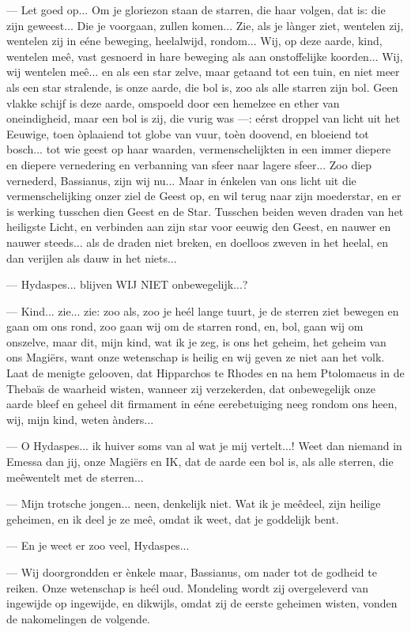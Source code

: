 \documentclass[a4paper, 12pt, oneside, dutch]{article}
\begin{document}
--- Let goed op... Om je gloriezon staan de starren, die haar volgen, dat is: die zijn geweest... Die je voorgaan, zullen komen... Zie, als je lànger ziet, wentelen zij, wentelen zij in eéne beweging, heelalwijd, rondom... Wij, op deze aarde, kind, wentelen meê, vast gesnoerd in hare beweging als aan onstoffelijke koorden... Wij, wij wentelen meê... en als een star zelve, maar getaand tot een tuin, en niet meer als een star stralende, is onze aarde, die bol is, zoo als alle starren zijn bol. Geen vlakke schijf is deze aarde, omspoeld door een hemelzee en ether van oneindigheid, maar een bol is zij, die vurig was ---: eérst droppel van licht uit het Eeuwige, toen òplaaiend tot globe van vuur, toèn doovend, en bloeiend tot bosch... tot wie geest op haar waarden, vermenschelijkten in een immer diepere en diepere vernedering en verbanning van sfeer naar lagere sfeer... Zoo diep vernederd, Bassianus, zijn wij nu... Maar in énkelen van ons licht uit die vermenschelijking onzer ziel de Geest op, en wil terug naar zijn moederstar, en er is werking tusschen dien Geest en de Star. Tusschen beiden weven draden van het heiligste Licht, en verbinden aan zijn star voor eeuwig den Geest, en nauwer en nauwer steeds... als de draden niet breken, en doelloos zweven in het heelal, en dan verijlen als dauw in het niets...

--- Hydaspes... blijven WIJ NIET onbewegelijk...?

--- Kind... zie... zie: zoo als, zoo je heél lange tuurt, je de sterren ziet bewegen en gaan om ons rond, zoo gaan wij om de starren rond, en, bol, gaan wij om onszelve, maar dit, mijn kind, wat ik je zeg, is ons het geheim, het geheim van ons Magiërs, want onze wetenschap is heilig en wij geven ze niet aan het volk. Laat de menigte gelooven, dat Hipparchos te Rhodes en na hem Ptolomaeus in de Thebaïs de waarheid wisten, wanneer zij verzekerden, dat onbewegelijk onze aarde bleef en geheel dit firmament in eéne eerebetuiging neeg rondom ons heen, wij, mijn kind, weten ànders...

--- O Hydaspes... ik huiver soms van al wat je mij vertelt...! Weet dan niemand in Emessa dan jij, onze Magiërs en IK, dat de aarde een bol is, als alle sterren, die meêwentelt met de sterren...

--- Mijn trotsche jongen... neen, denkelijk niet. Wat ik je meêdeel, zijn heilige geheimen, en ik deel je ze meê, omdat ik weet, dat je goddelijk bent.

--- En je weet er zoo veel, Hydaspes...

--- Wij doorgrondden er ènkele maar, Bassianus, om nader tot de godheid te reiken. Onze wetenschap is heél oud. Mondeling wordt zij overgeleverd van ingewijde op ingewijde, en dikwijls, omdat zij de eerste geheimen wisten, vonden de nakomelingen de volgende.
\end{document}
